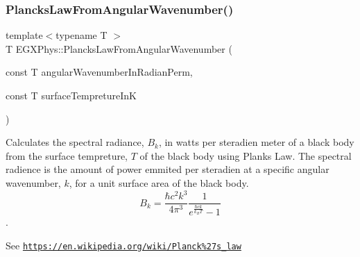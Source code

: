 \subsubsection{\texorpdfstring{Plancks\+Law\+From\+Angular\+Wavenumber()}{PlancksLawFromAngularWavenumber()}}
{\footnotesize\ttfamily template$<$typename T $>$ \\
T E\+G\+X\+Phys\+::\+Plancks\+Law\+From\+Angular\+Wavenumber (\begin{DoxyParamCaption}\item[{const T}]{angular\+Wavenumber\+In\+Radian\+Perm,  }\item[{const T}]{surface\+Tempreture\+InK }\end{DoxyParamCaption})}



Calculates the spectral radiance, $B_{k}$, in watts per steradien meter of a black body from the surface tempreture, $T$ of the black body using Plank\textquotesingle{}s Law. The spectral radience is the amount of power emmited per steradien at a specific angular wavenumber, $k$, for a unit surface area of the black body. \[ B_{k} = \dfrac{\hbar c^2 k^3}{4\pi^3} \dfrac{1}{e^{\frac{\hbar c k}{k_B T}} - 1} \]. 

See \href{https://en.wikipedia.org/wiki/Planck%27s_law}{\tt https\+://en.\+wikipedia.\+org/wiki/\+Planck\%27s\+\_\+law}


